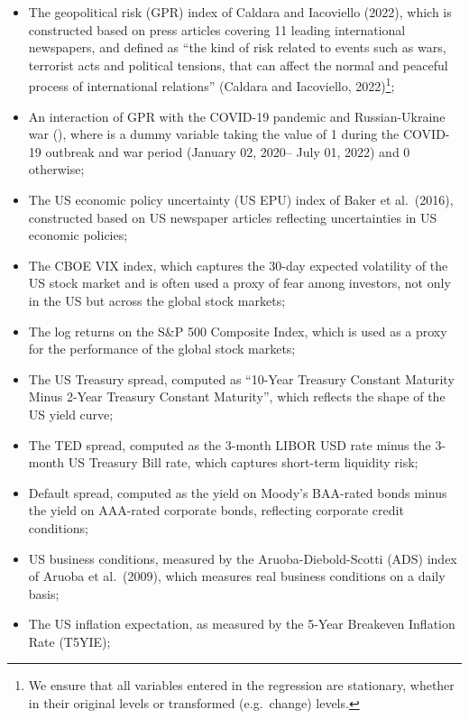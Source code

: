 \documentclass[
  letterpaper,
  DIV=11,
  numbers=noendperiod]{scrartcl}
\providecommand{\tightlist}{%
  \setlength{\itemsep}{0pt}\setlength{\parskip}{0pt}}\usepackage{longtable,booktabs,array}
\begin{document}
\begin{itemize}
\tightlist
\item
  The geopolitical risk (GPR) index of Caldara and Iacoviello (2022),
  which is constructed based on press articles covering 11 leading
  international newspapers, and defined as ``the kind of risk related to
  events such as wars, terrorist acts and political tensions, that can
  affect the normal and peaceful process of international relations''
  (Caldara and Iacoviello, 2022)\footnote{We ensure that all variables
    entered in the regression are stationary, whether in their original
    levels or transformed (e.g.~change) levels.};
\item
  An interaction of GPR with the COVID-19 pandemic and Russian-Ukraine
  war (), where is a dummy variable taking the value of 1 during the
  COVID-19 outbreak and war period (January 02, 2020-- July 01, 2022)
  and 0 otherwise;
\item
  The US economic policy uncertainty (US EPU) index of Baker et
  al.~(2016), constructed based on US newspaper articles reflecting
  uncertainties in US economic policies;
\item
  The CBOE VIX index, which captures the 30-day expected volatility of
  the US stock market and is often used a proxy of fear among investors,
  not only in the US but across the global stock markets;
\item
  The log returns on the S\&P 500 Composite Index, which is used as a
  proxy for the performance of the global stock markets;
\item
  The US Treasury spread, computed as ``10-Year Treasury Constant
  Maturity Minus 2-Year Treasury Constant Maturity'', which reflects the
  shape of the US yield curve;
\item
  The TED spread, computed as the 3-month LIBOR USD rate minus the
  3-month US Treasury Bill rate, which captures short-term liquidity
  risk;
\item
  Default spread, computed as the yield on Moody's BAA-rated bonds minus
  the yield on AAA-rated corporate bonds, reflecting corporate credit
  conditions;
\item
  US business conditions, measured by the Aruoba-Diebold-Scotti (ADS)
  index of Aruoba et al.~(2009), which measures real business conditions
  on a daily basis;
\item
  The US inflation expectation, as measured by the 5-Year Breakeven
  Inflation Rate (T5YIE);
\end{itemize}
\end{document}
